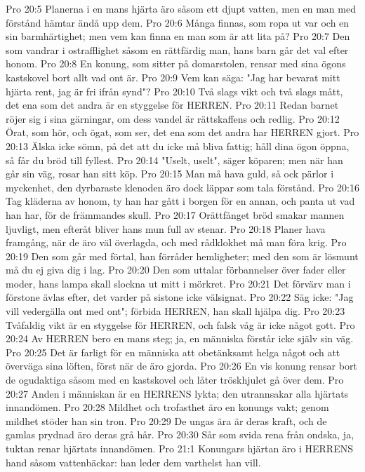 Pro 20:5  Planerna i en mans hjärta äro såsom ett djupt vatten, men en man med förstånd hämtar ändå upp dem.
Pro 20:6  Många finnas, som ropa ut var och en sin barmhärtighet; men vem kan finna en man som är att lita på?
Pro 20:7  Den som vandrar i ostrafflighet såsom en rättfärdig man, hans barn går det val efter honom.
Pro 20:8  En konung, som sitter på domarstolen, rensar med sina ögons kastskovel bort allt vad ont är.
Pro 20:9  Vem kan säga: "Jag har bevarat mitt hjärta rent, jag är fri ifrån synd"?
Pro 20:10  Två slags vikt och två slags mått, det ena som det andra är en styggelse för HERREN.
Pro 20:11  Redan barnet röjer sig i sina gärningar, om dess vandel är rättskaffens och redlig.
Pro 20:12  Örat, som hör, och ögat, som ser, det ena som det andra har HERREN gjort.
Pro 20:13  Älska icke sömn, på det att du icke må bliva fattig; håll dina ögon öppna, så får du bröd till fyllest.
Pro 20:14  "Uselt, uselt", säger köparen; men när han går sin väg, rosar han sitt köp.
Pro 20:15  Man må hava guld, så ock pärlor i myckenhet, den dyrbaraste klenoden äro dock läppar som tala förstånd.
Pro 20:16  Tag kläderna av honom, ty han har gått i borgen för en annan, och panta ut vad han har, för de främmandes skull.
Pro 20:17  Orättfånget bröd smakar mannen ljuvligt, men efteråt bliver hans mun full av stenar.
Pro 20:18  Planer hava framgång, när de äro väl överlagda, och med rådklokhet må man föra krig.
Pro 20:19  Den som går med förtal, han förråder hemligheter; med den som är lösmunt må du ej giva dig i lag.
Pro 20:20  Den som uttalar förbannelser över fader eller moder, hans lampa skall slockna ut mitt i mörkret.
Pro 20:21  Det förvärv man i förstone ävlas efter, det varder på sistone icke välsignat.
Pro 20:22  Säg icke: "Jag vill vedergälla ont med ont"; förbida HERREN, han skall hjälpa dig.
Pro 20:23  Tvåfaldig vikt är en styggelse för HERREN, och falsk våg är icke något gott.
Pro 20:24  Av HERREN bero en mans steg; ja, en människa förstår icke själv sin väg.
Pro 20:25  Det är farligt för en människa att obetänksamt helga något och att överväga sina löften, först när de äro gjorda.
Pro 20:26  En vis konung rensar bort de ogudaktiga såsom med en kastskovel och låter tröskhjulet gå över dem.
Pro 20:27  Anden i människan är en HERRENS lykta; den utrannsakar alla hjärtats innandömen.
Pro 20:28  Mildhet och trofasthet äro en konungs vakt; genom mildhet stöder han sin tron.
Pro 20:29  De ungas ära är deras kraft, och de gamlas prydnad äro deras grå hår.
Pro 20:30  Sår som svida rena från ondska, ja, tuktan renar hjärtats innandömen.
Pro 21:1  Konungars hjärtan äro i HERRENS hand såsom vattenbäckar: han leder dem varthelst han vill.
